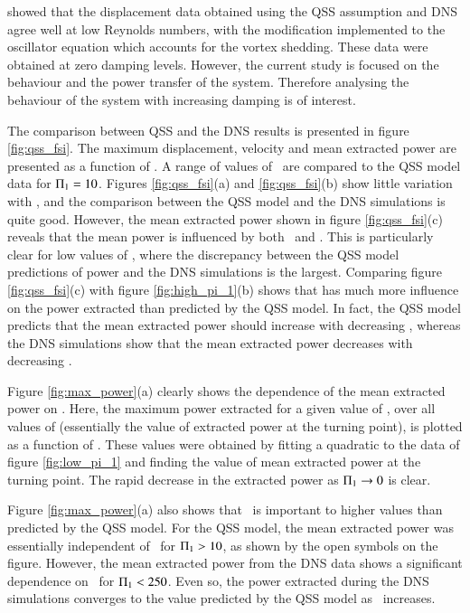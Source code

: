 \citet{Joly2012} showed that the displacement data obtained using the QSS assumption and DNS agree well at low Reynolds numbers, with the modification implemented to the oscillator equation which accounts for the vortex shedding. These data were obtained at zero damping levels. However, the current study is focused on the behaviour and the power transfer of the system. Therefore analysing the behaviour of the system with increasing damping is of interest.

The comparison between QSS and the DNS results is presented in figure \ref{fig:qss_fsi}. The maximum displacement, velocity and mean extracted power are presented as a function of \massdamp. A range of values of \massstiff\ are compared to the QSS model data for $\Pi_1 = 10$. Figures \ref{fig:qss_fsi}(a) and \ref{fig:qss_fsi}(b) show little variation with \massstiff, and the comparison between the QSS model and the DNS simulations is quite good. However, the mean extracted power shown in figure \ref{fig:qss_fsi}(c) reveals that the mean power is influenced by both \massstiff\ and \massdamp. This is particularly clear for low values of \massstiff, where the discrepancy between the QSS model predictions of power and the DNS simulations is the largest. Comparing figure \ref{fig:qss_fsi}(c) with figure \ref{fig:high_pi_1}(b) shows that \massstiff has much more influence on the power extracted than predicted by the QSS model. In fact, the QSS model predicts that the mean extracted power should increase with decreasing \massstiff, whereas the DNS simulations show that the mean extracted power decreases with decreasing \massstiff.



Figure \ref{fig:max_power}(a) clearly shows the dependence of the mean extracted power on \massstiff. Here, the maximum power extracted for a given value of \massstiff, over all values of \massdamp (essentially the value of extracted power at the turning point), is plotted as a function of \massstiff. These values were obtained by fitting a quadratic to the data of figure \ref{fig:low_pi_1} and finding the value of mean extracted power at the turning point. The rapid decrease in the extracted power as $\Pi_1 \rightarrow 0$ is clear.



Figure \ref{fig:max_power}(a) also shows that \massstiff\ is important to higher values than predicted by the QSS model. For the QSS model, the mean extracted power was essentially independent of \massstiff\ for $\Pi_1>10$, as shown by the open symbols on the figure. However, the mean extracted power from the DNS data shows a significant dependence on \massstiff\ for $\Pi_1<250$. Even so, the power extracted during the DNS simulations converges to the value predicted by the QSS model as \massstiff\ increases.

